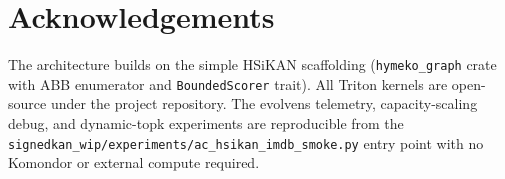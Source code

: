 \documentclass[11pt, a4paper]{article}
\begin{document}
\section*{Acknowledgements}

The architecture builds on the simple HSiKAN scaffolding
(\texttt{hymeko\_graph} crate with ABB enumerator and \texttt{BoundedScorer}
trait). All Triton kernels are open-source under the project repository.
The evolvens telemetry, capacity-scaling debug, and dynamic-topk
experiments are reproducible from the
\texttt{signedkan\_wip/experiments/ac\_hsikan\_imdb\_smoke.py} entry
point with no Komondor or external compute required.



\end{document}
